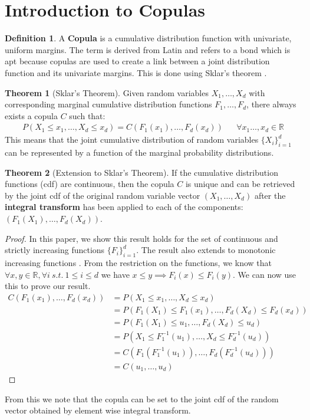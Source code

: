 \documentclass[12pt]{article}
\newcommand{\ds}{\displaystyle}
\theoremstyle{definition}
\newtheorem{theorem}{Theorem}
\theoremstyle{definition}
\newtheorem{definition}{Definition}
\begin{document}
\section{Introduction to Copulas}
\begin{definition}
A \textbf{Copula} is a cumulative distribution function with univariate, uniform margins\cite{nescopula}. The term is derived from Latin and refers to a bond which is apt because copulas are used to create a link between a joint distribution function and its univariate margins. This is done using Sklar's theorem \cite{incopula}.
\end{definition}

\begin{theorem}[Sklar's Theorem] Given random variables $X_1,\hdots,X_d$ with corresponding  marginal cumulative distribution functions $F_1,\hdots,F_d$, there always exists a copula $C$ such that:
\begin{align*}
    P(X_1\leq x_1, \hdots, X_d\leq x_d)=C( F_1(x_1),\hdots ,F_d(x_d)) &&\forall x_1\hdots,x_d\in\mathbb{R}
\end{align*}
This means that the joint cumulative distribution of random variables $\ds \{X_i\}_{i=1}^d $ can be represented by a function of the marginal probability distributions.
\end{theorem}

\begin{theorem}[Extension to Sklar's Theorem]
If the cumulative distribution functions (cdf) are continuous, then the copula $C$ is unique and can be retrieved by the joint cdf of the original random variable vector $(X_1,\hdots,X_d)$ after the \textbf{integral transform} has been applied to each of the components: $(F_1(X_1),\hdots,F_d(X_d))$.
\begin{proof}
In this paper, we show this result holds for the set of continuous and strictly increasing functions $\ds \{F_i\}_{i=1}^d$. The result also extends to monotonic increasing functions \cite{incopula}.
From the restriction on the functions, we know that $\forall x,y \in \mathbb{R} ,\forall i\ s.t.\ 1\leq i\leq d$ we have $x\leq y\implies F_i(x)\leq F_i(y)$. We can now use this to prove our result. 
\begin{align*}
    C( F_1(x_1),\hdots ,F_d(x_d))&=P(X_1\leq x_1,\hdots, X_d\leq x_d)\\
    &=P(F_1(X_1)\leq F_1(x_1),\hdots,F_d(X_d)\leq F_d(x_d))\\
    &=P(F_1(X_1)\leq u_1,\hdots,F_d(X_d)\leq u_d)\\
    &=P(X_1\leq F_1^{-1}(u_1),\hdots,X_d\leq F_d^{-1}(u_d))\\
    &=C(F_1(F_1^{-1}(u_1)),\hdots,F_d(F_d^{-1}(u_d)))\\
    &=C(u_1,\hdots,u_d)
\end{align*}
\end{proof}
\noindent From this we note that the copula can be set to the joint cdf of the random vector obtained by element wise integral transform.
\end{theorem}
\end{document}
